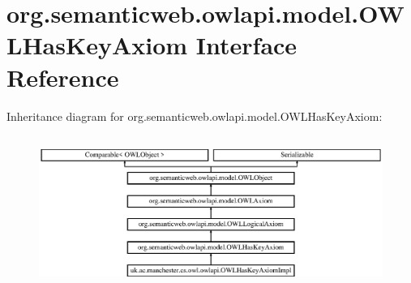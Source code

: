 \hypertarget{interfaceorg_1_1semanticweb_1_1owlapi_1_1model_1_1_o_w_l_has_key_axiom}{\section{org.\-semanticweb.\-owlapi.\-model.\-O\-W\-L\-Has\-Key\-Axiom Interface Reference}
\label{interfaceorg_1_1semanticweb_1_1owlapi_1_1model_1_1_o_w_l_has_key_axiom}
}
Inheritance diagram for org.\-semanticweb.\-owlapi.\-model.\-O\-W\-L\-Has\-Key\-Axiom\-:\begin{figure}[H]
\begin{center}
\leavevmode
\includegraphics[height=5.060241cm]{interfaceorg_1_1semanticweb_1_1owlapi_1_1model_1_1_o_w_l_has_key_axiom}
\end{center}
\end{figure}
